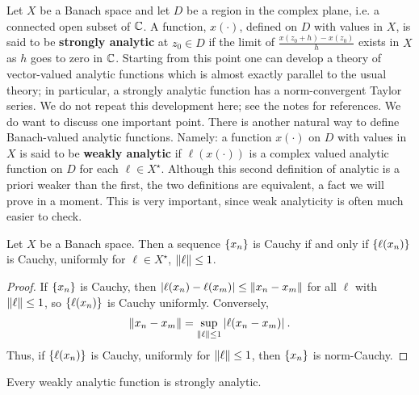 Let $X$ be a Banach space and let $D$ be a region in the complex plane, i.e. a connected open subset of $\mathbb{C}$. A function, $x(\cdot)$, defined on $D$ with values in $X$, is said to be \textbf{strongly analytic} at $z_0 \in D$ if the limit of $\frac{x(z_0+h)-x(z_0)}{h}$ exists in $X$ as $h$ goes to zero in $\mathbb{C}$. Starting from this point one can develop a theory of vector-valued analytic functions which is almost exactly parallel to the usual theory; in particular, a strongly analytic function has a norm-convergent Taylor series. We do not repeat this development here; see the notes for references. We do want to discuss one important point. There is another natural way to define Banach-valued analytic functions. Namely: a
function $x(\cdot)$ on $D$ with values in $X$ is said to be \textbf{weakly analytic} if $\ell(x(\cdot))$ is a complex valued analytic function on $D$ for each $\ell \in X^\star$. Although this second definition of analytic is a priori weaker than the first, the two definitions are equivalent, a fact we will prove in a moment. This is very important, since weak analyticity is often much easier to check.

\begin{lemma}
    Let $X$ be a Banach space. Then a sequence $\left \lbrace x_n \right \rbrace$ is Cauchy if and only if $\left \lbrace \ell(x_n) \right \rbrace$ is Cauchy, uniformly for $\ell \in X^\star$, $\left \Vert \ell \right \Vert \leq 1$.
\end{lemma}

\begin{proof}
    If $\left \lbrace x_n \right \rbrace$ is Cauchy, then $|\ell(x_n) - \ell(x_m)| \leq \left \Vert x_n-x_m \right \Vert$ for all $\ell$ with $\left \Vert \ell \right \Vert \leq 1$, so $\left \lbrace \ell(x_n) \right \rbrace$ is Cauchy uniformly. Conversely,
    \begin{align}
        \left \Vert x_n-x_m \right \Vert = \sup_{\left \Vert \ell \right \Vert \leq 1} |\ell(x_n-x_m)| \:.
    \end{align} 
    Thus, if $\left \lbrace \ell(x_n) \right \rbrace$ is Cauchy, uniformly for $\left \Vert \ell \right \Vert \leq 1$, then $\left \lbrace x_n \right \rbrace$ is norm-Cauchy.
\end{proof}

\begin{theorem}
    Every weakly analytic function is strongly analytic.
\end{theorem}

